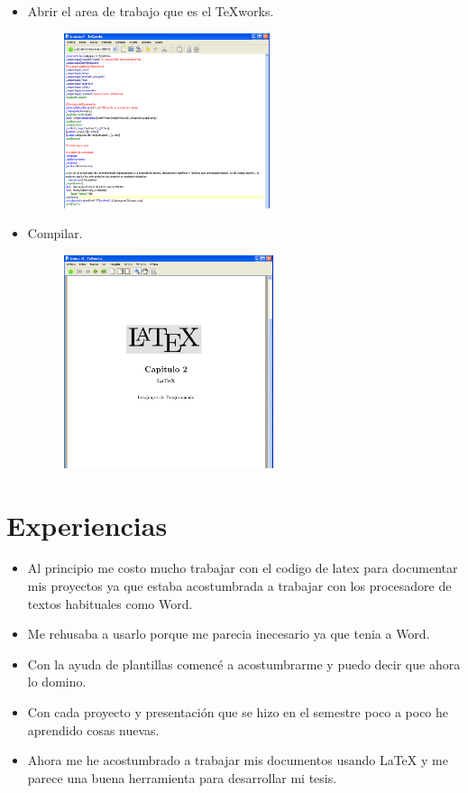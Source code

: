 \begin{itemize}
         \item Abrir el area de trabajo que es el TeXworks.
             \begin{figure}[htb]
                \centering
                \includegraphics[width=0.57\textwidth]{./imagenes2/image1.png}
             \end{figure}
        \item Compilar.
            \begin{figure}[htb]
               \centering
                \includegraphics[width=0.58\textwidth]{./imagenes2/image2.png}
             \end{figure}

        \end{itemize}

 \section{ Experiencias}
  \begin{itemize}
\item Al principio me costo mucho trabajar con el codigo de latex para documentar mis proyectos ya que estaba acostumbrada a trabajar con los procesadore de textos habituales como Word.
\item Me rehusaba a usarlo porque me parecia inecesario ya que tenia a Word.
\item Con la ayuda de plantillas comencé a acostumbrarme y puedo decir que ahora lo domino. 
\item Con cada proyecto y presentación que se hizo en el semestre poco a poco he aprendido cosas nuevas.
\item Ahora me he acostumbrado a trabajar mis documentos usando LaTeX y me parece una buena herramienta para desarrollar mi tesis.
\end{itemize}

%


